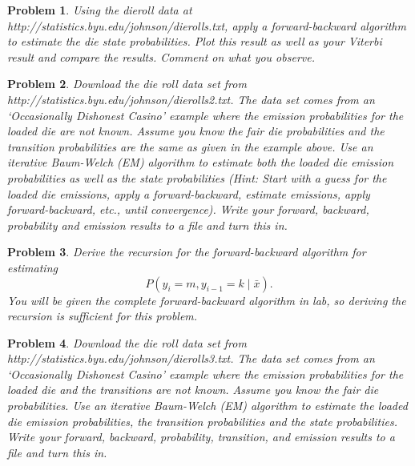 \documentclass{article}
\numberwithin{equation}{section}
\renewcommand{\P}{P}
\newtheorem{problem}{Problem}
\begin{document}
\begin{problem}
Using the dieroll data at
http://statistics.byu.edu/johnson/dierolls.txt, apply a
forward-backward algorithm to estimate the die state probabilities.
Plot this result as well as your Viterbi result and compare the
results.  Comment on what you observe.
\end{problem}

\begin{problem}
Download the die roll data set from
http://statistics.byu.edu/johnson/dierolls2.txt.  The data set comes
from an `Occasionally Dishonest Casino' example where the emission
probabilities for the loaded die are not known.  Assume you know the
fair die probabilities and the transition probabilities are the same
as given in the example above.  Use an iterative Baum-Welch (EM)
algorithm to estimate both the loaded die emission probabilities as
well as the state probabilities (Hint: Start with a guess for the
loaded die emissions, apply a forward-backward, estimate emissions,
apply forward-backward, etc., until convergence).  Write your
forward, backward, probability and emission results to a file and
turn this in.
\end{problem}

\begin{problem}
Derive the recursion for the forward-backward algorithm for
estimating
\[
\P(y_i=m,y_{i-1}=k\mid \bar{x}).
\]
You will be given the complete forward-backward algorithm in lab, so
deriving the recursion is sufficient for this problem.
\end{problem}

\begin{problem}
Download the die roll data set from
http://statistics.byu.edu/johnson/dierolls3.txt.  The data set comes
from an `Occasionally Dishonest Casino' example where the emission
probabilities for the loaded die and the transitions are not known.
Assume you know the fair die probabilities.  Use an iterative
Baum-Welch (EM) algorithm to estimate the loaded die emission
probabilities, the transition probabilities and the state
probabilities.  Write your forward, backward, probability,
transition, and emission results to a file and turn this in.
\end{problem}
\end{document}
